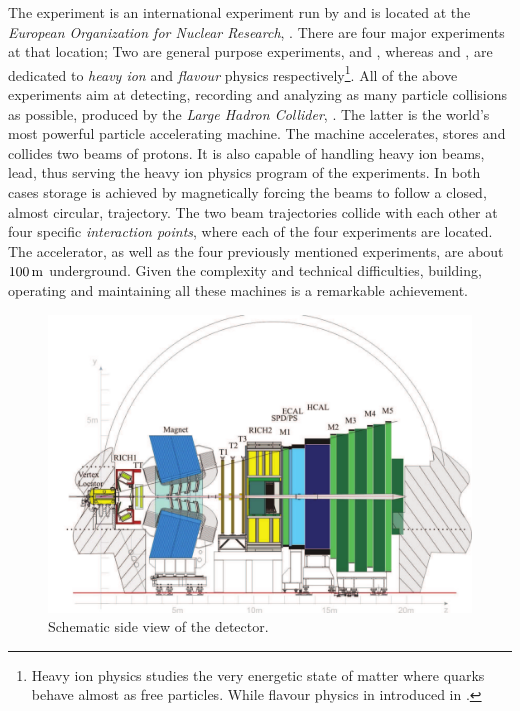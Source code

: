 
The \lhcb experiment is an international experiment run by and is located at the {\it European Organization for Nuclear Research}, \cern.
There are four major experiments at that location; Two are general purpose experiments, \atlas and \cms, whereas
\alice and \lhcb, are dedicated to {\it heavy ion} and {\it flavour} physics respectively\footnote{Heavy ion physics
studies the very energetic state of matter where quarks behave almost as free particles. 
While flavour physics in introduced in .}. All of the above experiments aim at detecting, 
recording and analyzing as many particle collisions as possible, produced by the {\it Large Hadron Collider}, \lhc.
The latter is the world's most powerful particle accelerating machine.
The \lhc machine accelerates, stores and collides two beams of protons. It is also capable of handling
heavy ion beams, \eg lead, thus serving the heavy ion physics program of the experiments.
In both cases storage is achieved by magnetically forcing the beams to follow a closed, almost circular,
trajectory. The two beam trajectories collide with each other at four specific {\it interaction points},
where each of the four experiments are located. The \lhc accelerator, as well as the four previously
mentioned experiments, are about $100\rm \,m$ underground. Given the complexity and technical difficulties, 
building, operating and maintaining all these machines is a remarkable achievement.

\begin{figure}[t]
  \centering
  \includegraphics[width=1\textwidth]{Figures/Chapter2/detector_cross_cmyk}
  \caption{Schematic side view of the \lhcb detector.}
  \label{lhcb_detector_cross_section}
\end{figure}

